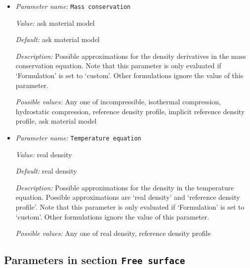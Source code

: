 \begin{itemize}



{\it Possible values:} Any one of isothermal compression, custom, anelastic liquid approximation, Boussinesq approximation
\item {\it Parameter name:} {\tt Mass conservation}
\label{parameters:Formulation/Mass conservation}


{\it Value:} ask material model


{\it Default:} ask material model


{\it Description:} Possible approximations for the density derivatives in the mass conservation equation. Note that this parameter is only evaluated if `Formulation' is set to `custom'. Other formulations ignore the value of this parameter.


{\it Possible values:} Any one of incompressible, isothermal compression, hydrostatic compression, reference density profile, implicit reference density profile, ask material model
\item {\it Parameter name:} {\tt Temperature equation}
\label{parameters:Formulation/Temperature equation}


{\it Value:} real density


{\it Default:} real density


{\it Description:} Possible approximations for the density in the temperature equation. Possible approximations are `real density' and `reference density profile'. Note that this parameter is only evaluated if `Formulation' is set to `custom'. Other formulations ignore the value of this parameter.


{\it Possible values:} Any one of real density, reference density profile
\end{itemize}

\subsection{Parameters in section \tt Free surface}
\label{parameters:Free_20surface}

